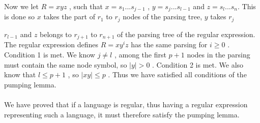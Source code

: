 \documentclass{report}
\newcommand{\me}[1]{
\begin{math}
#1
\end{math}
}
\begin{document}
 Now we let \me{R =xyz}, such that \me{x=s_1...s_{j-1}} , \me{y=s_j...s_{l-1}} and \me{z=s_l ...s_n.} This is done so\me{ x} takes the part of \me{r_1} to \me{r_j} nodes of the parsing tree, \me{y} takes \me{r_j} \me{r_{l-1}}and \me{z} belongs to \me{r_{j+1}} to \me{r_{n+1}}  of the parsing tree of the regular expression. The regular expression defines \me{R=xy^iz} has the same parsing for \me{i \geq 0}. Condition 1 is met. We know \me{j \neq l}, among the first \me{p+1} nodes in the parsing must contain the same node symbol, so \me{|y| > 0}. Condition 2 is met. We also know that \me{l \leq p+1}, so \me{|xy| \leq p}. Thus we have satisfied all conditions of the pumping lemma.  \\ \\
 
 We have proved that if a language is regular, thus having a regular expression representing such a language, it must therefore satisfy the pumping lemma. 
\ \ \\

	


\end{document}

